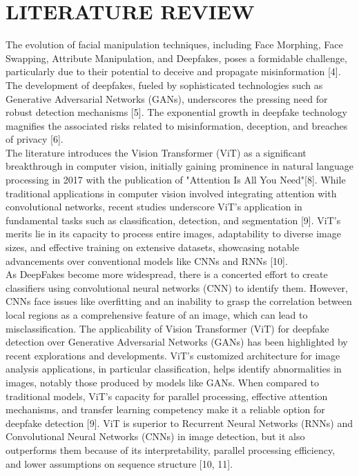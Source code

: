 \section{LITERATURE REVIEW}

The evolution of facial manipulation techniques, including Face Morphing, Face Swapping, Attribute Manipulation, and Deepfakes, poses a formidable challenge, particularly due to their potential to deceive and propagate misinformation [4]. The development of deepfakes, fueled by sophisticated technologies such as Generative Adversarial Networks (GANs), underscores the pressing need for robust detection mechanisms [5]. The exponential growth in deepfake technology magnifies the associated risks related to misinformation, deception, and breaches of privacy [6].\\

The literature introduces the Vision Transformer (ViT) as a significant breakthrough in computer vision, initially gaining prominence in natural language processing in 2017 with the publication of "Attention Is All You Need"[8]. While traditional applications in computer vision involved integrating attention with convolutional networks, recent studies underscore ViT's application in fundamental tasks such as classification, detection, and segmentation [9]. ViT's merits lie in its capacity to process entire images, adaptability to diverse image sizes, and effective training on extensive datasets, showcasing notable advancements over conventional models like CNNs and RNNs [10].\\

As DeepFakes become more widespread, there is a concerted effort to create classifiers using convolutional neural networks (CNN) to identify them. However, CNNs face issues like overfitting and an inability to grasp the correlation between local regions as a comprehensive feature of an image, which can lead to misclassification. The applicability of Vision Transformer (ViT) for deepfake detection over Generative Adversarial Networks (GANs) has been highlighted by recent explorations and developments. ViT's customized architecture for image analysis applications, in particular classification, helps identify abnormalities in images, notably those produced by models like GANs. When compared to traditional models, ViT's capacity for parallel processing, effective attention mechanisms, and transfer learning competency make it a reliable option for deepfake detection [9]. ViT is superior to Recurrent Neural Networks (RNNs) and Convolutional Neural Networks (CNNs) in image detection, but it also outperforms them because of its interpretability, parallel processing efficiency, and lower assumptions on sequence structure [10, 11].\\

